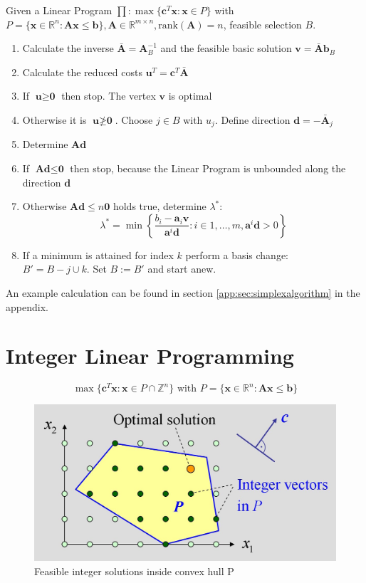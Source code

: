 \documentclass[11pt]{article}
\begin{document}
Given a Linear Program $\prod: \max\{ \textbf{c}^T\textbf{x}:\textbf{x} \in P \}$ with  $P=\{ \textbf{x}\in\mathbb{R}^n:\textbf{A}\textbf{x}\leq\textbf{b}\}, \textbf{A}\in\mathbb{R}^{m\times n}, \text{rank}(\textbf{A})=n$, feasible selection $B$.
\begin{enumerate}[label=\roman*)]
	\item Calculate the inverse $\bar{\textbf{A}}=\textbf{A}_B^{-1}$ and the feasible basic solution $\textbf{v} = \bar{\textbf{A}}\textbf{b}_B$
	\item Calculate the reduced costs $\textbf{u}^T = \textbf{c}^T \bar{\textbf{A}}$
	\item If $\textbf{u}\geq \textbf{0}$ then stop. The vertex $\textbf{v}$ is optimal
	\item Otherwise it is $\textbf{u}\ngeq\textbf{0}$. Choose $j\in B$ with $u_j$. Define direction $\textbf{d}=-\bar{\textbf{A}}_j$
	\item Determine $\textbf{A}\textbf{d}$
	\item If $\textbf{A}\textbf{d}\leq \textbf{0}$ then stop, because the Linear Program is unbounded along the direction $\textbf{d}$
	\item Otherwise $\textbf{A}\textbf{d}\leq n\textbf{0}$ holds true, determine $\lambda^*$:
	\begin{equation*}
		\lambda^* = \min\left\{ \frac{b_i - \textbf{a}_i \textbf{v}}{\textbf{a}^i\textbf{d}} : i\in 1,\dots,m , \textbf{a}^i\textbf{d}>0 \right\}
	\end{equation*}
	\item If a minimum is attained for index $k$ perform a basis change:\\
	$B' = B - {j}\cup{k}$. Set $B:=B'$ and start anew.
\end{enumerate}

An example calculation can be found in section \ref{app:sec:simplexalgorithm} in the appendix.

\section{Integer Linear Programming}
\begin{equation*}
	\max\{\textbf{c}^T \textbf{x} : \textbf{x} \in P \cap \mathbb{Z}^n \}\text{ with }P = \{\textbf{x} \in \mathbb{R}^n : \textbf{A}\textbf{x} \leq \textbf{b}\}
\end{equation*}

\begin{figure}[H]
	\centering
	\includegraphics[width=0.7\linewidth]{img/linear_integer_programming}
	\caption{Feasible integer solutions inside convex hull P}
	\label{fig:linearintegerprogramming}
\end{figure}
\end{document}
